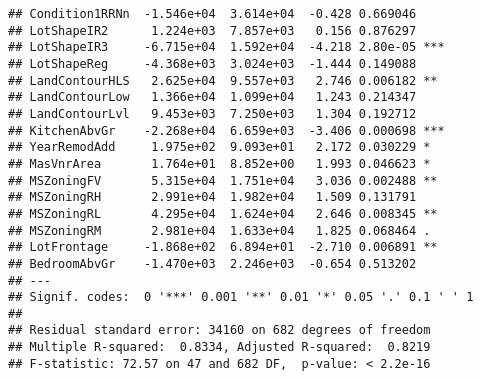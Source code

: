\documentclass[
]{article}
\begin{document}
\begin{verbatim}
## Condition1RRNn  -1.546e+04  3.614e+04  -0.428 0.669046    
## LotShapeIR2      1.224e+03  7.857e+03   0.156 0.876297    
## LotShapeIR3     -6.715e+04  1.592e+04  -4.218 2.80e-05 ***
## LotShapeReg     -4.368e+03  3.024e+03  -1.444 0.149088    
## LandContourHLS   2.625e+04  9.557e+03   2.746 0.006182 ** 
## LandContourLow   1.366e+04  1.099e+04   1.243 0.214347    
## LandContourLvl   9.453e+03  7.250e+03   1.304 0.192712    
## KitchenAbvGr    -2.268e+04  6.659e+03  -3.406 0.000698 ***
## YearRemodAdd     1.975e+02  9.093e+01   2.172 0.030229 *  
## MasVnrArea       1.764e+01  8.852e+00   1.993 0.046623 *  
## MSZoningFV       5.315e+04  1.751e+04   3.036 0.002488 ** 
## MSZoningRH       2.991e+04  1.982e+04   1.509 0.131791    
## MSZoningRL       4.295e+04  1.624e+04   2.646 0.008345 ** 
## MSZoningRM       2.981e+04  1.633e+04   1.825 0.068464 .  
## LotFrontage     -1.868e+02  6.894e+01  -2.710 0.006891 ** 
## BedroomAbvGr    -1.470e+03  2.246e+03  -0.654 0.513202    
## ---
## Signif. codes:  0 '***' 0.001 '**' 0.01 '*' 0.05 '.' 0.1 ' ' 1
## 
## Residual standard error: 34160 on 682 degrees of freedom
## Multiple R-squared:  0.8334, Adjusted R-squared:  0.8219 
## F-statistic: 72.57 on 47 and 682 DF,  p-value: < 2.2e-16
\end{verbatim}
\end{document}
